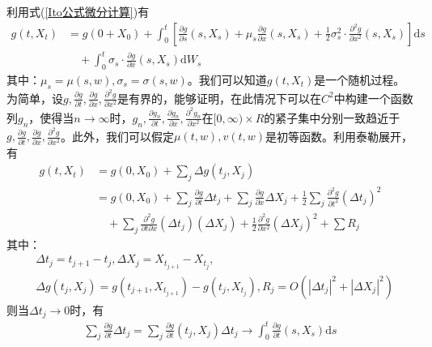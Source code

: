             \begin{Proof}
                利用式(\ref{Ito公式微分计算})有
                \begin{align*}
                    g(t,X_t) &= g(0+X_0)+\int_0^t\left[ \frac{\partial g}{\partial s}(s,X_s) +\mu_s \frac{\partial g}{\partial x}(s,X_s) + \frac 12 \sigma_s^2 \cdot \frac{\partial^2 g}{\partial x^2}(s,X_s)\right] \mathrm{d}s \\
                    &\quad +\int_0^t\sigma_s \cdot \frac{\partial g}{\partial x}(s,X_s) \mathrm{d}W_s
                \end{align*}
                其中：$\mu_s = \mu(s,w),\sigma_s = \sigma(s,w)$。我们可以知道$g(t,X_t)$是一个随机过程。为简单，设$g,\frac{\partial g}{\partial t},\frac{\partial g}{\partial x},\frac{\partial^2 g}{\partial x^2}$是有界的，能够证明，在此情况下可以在$C^2$中构建一个函数列$g_n$，使得当$n\rightarrow \infty$时，$g_n,\frac{\partial g_n}{\partial t},\frac{\partial g_n}{\partial x},\frac{\partial^2 g_n}{\partial x^2}$在$[0,\infty)\times R$的紧子集中分别一致趋近于$g,\frac{\partial g}{\partial t},\frac{\partial g}{\partial x},\frac{\partial^2 g}{\partial x^2}$。此外，我们可以假定$\mu(t,w),v(t,w)$是初等函数。利用泰勒展开，有
                \begin{align*}
                    g(t,X_t) &= g(0,X_0) + \sum_j\Delta g(t_j,X_j)\\
                    & = g(0,X_0)+\sum_j \frac{\partial g}{\partial t}\Delta t_j +\sum_j\frac{\partial g}{\partial x}\Delta X_j + \frac 12 \sum_j \frac{\partial^2 g}{\partial t^2}(\Delta t_j)^2\\
                    & \quad + \sum_j \frac{\partial^2 g}{\partial t \partial x}(\Delta t_j)(\Delta X_j) + \frac 12 \frac{\partial^2 g}{\partial x^2}(\Delta X_j)^2 + \sum R_j
                \end{align*}
                其中：
                \begin{align*}
                &\Delta t_j = t_{j+1} - t_j ,\Delta X_j = X_{t_{j+1}} - X_{t_j},\\
                &\Delta g(t_j,X_j) = g(t_{j+1},X_{t_{j+1}}) - g(t_j,X_{t_j}),R_j = O (|\Delta t_j|^2 +|\Delta X_j|^2)
                \end{align*}
                则当$\Delta t_j \rightarrow 0$时，有
                \begin{align*}
                    \sum_j \frac{\partial g}{\partial t}\Delta t_j = \sum_j \frac{\partial g}{\partial t}(t_j,X_j)\Delta t_j \rightarrow \int_0^t\frac{\partial g}{\partial t}(s,X_s) \mathrm{d}s\\

\end{align*}
\end{Proof}

